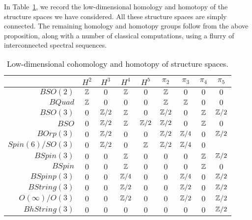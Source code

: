 \documentclass{amsart}
\begin{document}
In Table~\ref{table-structurecalc}, we record the low-dimensional homology and homotopy of the structure spaces we have considered.  All these structure spaces are simply connected.  The remaining homology and homotopy groups follow from the above proposition, along with a number of classical computations, using a flurry of interconnected spectral sequences.  

\begin{table}[!ht]
\begin{tabular}{|r||c|c|c|c||c|c|c|c|}
\hline
& $H^2$ & $H^3$ & $H^4$ & $H^5$ & $\pi_2$ & $\pi_3$ & $\pi_4$ & $\pi_5$ \\
\hline
$BSO(2)$ %
& $\mathbb Z$ & $0$ & $\mathbb Z$ & $0$ 
& $\mathbb Z$ & $0$ & $0$ & $0$ \\
$BQuad$ %
& $\mathbb Z$ & $0$ & $0$ & $0$
& $\mathbb Z$ & $\mathbb Z$ & $0$ & $0$ \\
$BSO(3)$ %
& $0$ & $\mathbb Z/2$ & $\mathbb Z$ & $0$
& $\mathbb Z/2$ & $0$ & $\mathbb Z$ & $\mathbb Z/2$ \\ %
$BSO$
& $0$ & $\mathbb Z/2$ & $\mathbb Z$ & $\mathbb Z/2$ %
& $\mathbb Z/2$ & $0$ & $\mathbb Z$ & $0$ \\ %
$BOrp(3)$ %
& $0$ & $\mathbb Z/2$ & $0$ & $0$ 
& $\mathbb Z/2$ & $\mathbb Z/4$ & $0$ & $\mathbb Z/2$  \\
$Spin(6)/SO(3)$ %
& $0$ & $\mathbb Z/2$ & $0$ & $\mathbb Z$ %
& $\mathbb Z/2$ & $\mathbb Z/4$ & $0$ & \CDcomm{$??$} \\
$BSpin(3)$ %
& $0$ & $0$ & $\mathbb Z$ & $0$
& $0$ & $0$ & $\mathbb Z$ & $\mathbb Z/2$ \\
$BSpin$
& $0$ & $0$ & $\mathbb Z$ & $0$ %
& $0$ & $0$ & $\mathbb Z$ & $0$ \\ %
$BSpinp(3)$
& $0$ & $0$ & $\mathbb Z/4$ & $0$
& $0$ & $\mathbb Z/4$ & $0$ & $\mathbb Z/2$ \\
$BString(3)$ %
& $0$ & $0$ & $\mathbb Z/2$ & $0$
& $0$ & $\mathbb Z/2$ & $0$ & $\mathbb Z/2$ \\
$O(\infty)/O(3)$ %
& $0$ & $0$ & $\mathbb Z/2$ & $0$
& $0$ & $\mathbb Z/2$ & $0$ & $\mathbb Z/2$ \\
$BhString(3)$ %
& $0$ & $0$ & $0$ & $0$
& $0$ & $0$ & $0$ & $\mathbb Z/2$ \\
\hline 
\end{tabular} \vspace*{8pt}
\caption{Low-dimensional cohomology and homotopy of structure spaces.} \label{table-structurecalc}
\end{table} 
\end{document}
